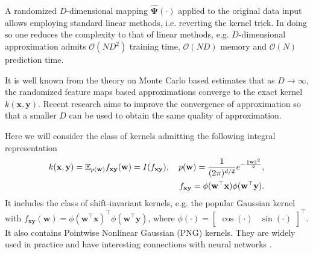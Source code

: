 A randomized $D$-dimensional mapping $\mathbf{\hat{\Psi}}(\cdot)$ applied to the original data
input allows employing standard linear methods, i.e. reverting the kernel trick. In doing so
one reduces the complexity to that of linear methods, e.g. $D$-dimensional approximation
admits $\mathcal{O}(ND^2)$ training time, $\mathcal{O}(ND)$ memory and  $\mathcal{O}(N)$
prediction time.

It is well known from the theory on Monte Carlo based estimates
that as $D \rightarrow \infty$, the randomized feature maps based
approximations converge to the exact kernel $k(\mathbf{x, y})$.
Recent research \citep{yang2014quasi, felix2016orthogonal, choromanski2016recycling} aims to improve the convergence of approximation so that a smaller $D$ can be used to obtain the same quality of approximation.

Here we will consider the class of kernels admitting the following integral representation
\begin{equation}
\label{eq:integral_representation}
    \begin{aligned}
        k(\mathbf{x}, \mathbf{y}) =
        \mathbb{E}_{p(\mathbf{w})} f_{\mathbf{xy}}(\mathbf{w}) =
        I(f_{\mathbf{xy}}),
        \quad p(\mathbf{w}) = \frac{1}{(2 \pi)^{d/2}} e^{-\frac{\|\mathbf{w}\|^2}{2}},
        \\
        \quad f_{\mathbf{xy}} = \phi(\mathbf{w}^{\top}\mathbf{x})
        \phi(\mathbf{w}^{\top} \mathbf{y}).
    \end{aligned}
\end{equation}
It includes the class of shift-invariant kernels,
e.g. the popular Gaussian kernel with
$f_{\mathbf{xy}}(\mathbf{w}) =
\phi(\mathbf{w}^{\boldsymbol{\top}}\mathbf{x})^{\boldsymbol{\top}}
\phi(\mathbf{w}^{\boldsymbol{\top}}\mathbf{y})$,
where $\phi(\cdot) = \begin{bmatrix}\cos(\cdot) & \sin(\cdot) \end{bmatrix}^{\boldsymbol{\top}}$.
It also contains Pointwise Nonlinear Gaussian (PNG) kernels.
They are widely used in practice and have interesting connections with neural networks
\citep{cho2009kernel, williams1997computing}.

